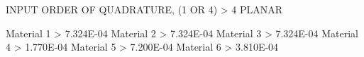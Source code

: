 INPUT ORDER OF QUADRATURE, (1 OR 4) > 4 PLANAR

  Material  1 > 7.324E-04
  Material  2 > 7.324E-04
  Material  3 > 7.324E-04
  Material  4 > 1.770E-04
  Material  5 > 7.200E-04
  Material  6 > 3.810E-04
